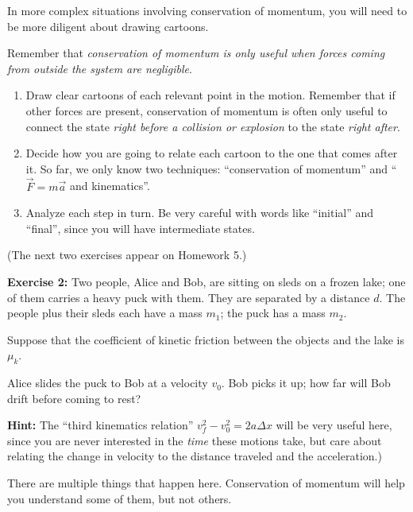 \documentclass[12pt]{article}
\begin{document}
\newpage

		
		In more complex situations involving conservation of momentum, you will need to be more diligent about drawing cartoons.
		
		Remember that {\it conservation of momentum is only useful when forces coming from outside the system are negligible}. 
		
		\begin{enumerate}
			\item Draw clear cartoons of each relevant point in the motion. Remember that if other forces are present, conservation of momentum is often only useful to connect the state {\it right before a collision or explosion} to the state {\it right after}.
			\item Decide how you are going to relate each cartoon to the one that comes after it. So far, we only know two techniques: ``conservation of momentum'' and ``$\vec F = m \vec a$ and kinematics''.
			\item Analyze each step in turn. Be very careful with words like ``initial'' and ``final'', since you will have intermediate states.
		\end{enumerate}

{\it \begin{center} (The next two exercises appear on Homework 5.) \end{center}}

\vspace{1in}

{\bf Exercise 2:} Two people, Alice and Bob, are sitting on sleds on a frozen lake; one of them carries a heavy puck with them. They are separated by a distance $d$. The people plus their sleds each have a mass $m_1$; the puck has a mass $m_2$.

Suppose that the coefficient of kinetic friction between the objects and the lake is $\mu_k$.

Alice slides the puck to Bob at a velocity $v_0$. Bob picks it up; how far will Bob drift before coming to rest?

{\bf Hint:} The ``third kinematics relation'' $v_f^2 - v_0^2 = 2a\Delta x$ will be very useful here, since you are never interested in the {\it time} these motions take, but care about relating the change in velocity to the distance traveled and the acceleration.)

	
	
	There are multiple things that happen here. Conservation of momentum will help you understand some of them, but not others.
	
\end{document}

